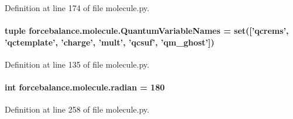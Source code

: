 Definition at line 174 of file molecule.\-py.

\hypertarget{namespaceforcebalance_1_1molecule_ab67efeab6049ec1f416b9ad1eed6ffcc}{
\paragraph[{Quantum\-Variable\-Names}]{\setlength{\rightskip}{0pt plus 5cm}tuple forcebalance.\-molecule.\-Quantum\-Variable\-Names = set(\mbox{[}'qcrems', 'qctemplate', 'charge', 'mult', 'qcsuf', 'qm\-\_\-ghost'\mbox{]})}}\label{namespaceforcebalance_1_1molecule_ab67efeab6049ec1f416b9ad1eed6ffcc}


Definition at line 135 of file molecule.\-py.

\hypertarget{namespaceforcebalance_1_1molecule_a1ee5389ce8a9042e053c7972dbbfb005}{
\paragraph[{radian}]{\setlength{\rightskip}{0pt plus 5cm}int forcebalance.\-molecule.\-radian = 180}}\label{namespaceforcebalance_1_1molecule_a1ee5389ce8a9042e053c7972dbbfb005}


Definition at line 258 of file molecule.\-py.

